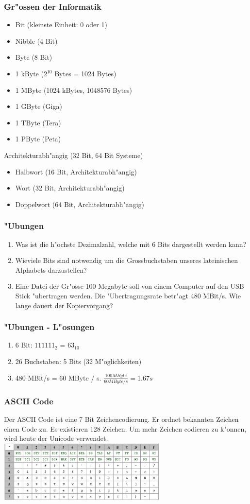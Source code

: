 \documentclass{beamer}
\begin{document}
\frame
{
	\frametitle{Gr"ossen der Informatik}
	{\small
	\begin{itemize}
	\item Bit (kleinste Einheit: 0 oder 1)
	\item Nibble (4 Bit)
	\item Byte (8 Bit)
	\item 1 kByte ($2^{10}$ Bytes = 1024 Bytes)
	\item 1 MByte (1024 kBytes, 1048576 Bytes)
	\item 1 GByte (Giga)
	\item 1 TByte (Tera)
	\item 1 PByte (Peta)
	\end{itemize}
	Architekturabh"angig (32 Bit, 64 Bit Systeme)
	\begin{itemize}
	\item Halbwort (16 Bit, Architekturabh"angig)
	\item Wort (32 Bit, Architekturabh"angig)
	\item Doppelwort (64 Bit, Architekturabh"angig)
	\end{itemize}
	}
}

\frame
{
	\frametitle{"Ubungen}
	\begin{enumerate}
	\item Was ist die h"ochste Dezimalzahl, welche mit 6 Bits dargestellt werden kann?
	\item Wieviele Bits sind notwendig um die Grossbuchstaben unseres lateinischen Alphabets darzustellen?
	\item Eine Datei der Gr"osse 100 Megabyte soll von einem Computer auf den USB Stick
	"ubertragen werden. Die "Ubertragungsrate betr"agt 480 MBit/s. Wie lange dauert der Kopiervorgang?
	\end{enumerate}
}

\frame
{
	\frametitle{"Ubungen - L"osungen}
	\begin{enumerate}
	\item 6 Bit: $111111_2$ = $63_{10}$
	\item 26 Buchstaben: 5 Bits (32 M"oglichkeiten)
	\item 480 MBit/s = 60 MByte / s. $\frac{100 MByte}{60 MByte/s} = 1.67s$
	\end{enumerate}
}

\frame
{
	\frametitle{ASCII Code}
	Der ASCII Code ist eine 7 Bit Zeichencodierung. Er ordnet bekannten Zeichen
	einen Code zu. Es existieren 128 Zeichen. Um mehr Zeichen codieren zu k"onnen,
	wird heute der Unicode verwendet.\\
	\includegraphics[width=240pt]{ascii.ps}

}
\end{document}

